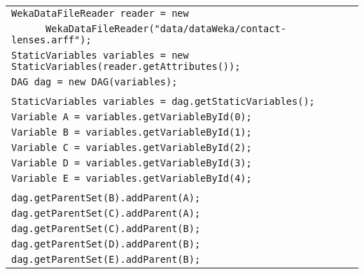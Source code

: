\begin{table}[H]
\begin{tabular}{l} \hline

        \texttt{WekaDataFileReader reader = new}\\
         \texttt{~~~~~~WekaDataFileReader("data/dataWeka/contact-lenses.arff");}\\

        \texttt{StaticVariables variables = new StaticVariables(reader.getAttributes());}\\
        \texttt{DAG dag = new DAG(variables);}\\\\

        \texttt{StaticVariables variables = dag.getStaticVariables();}\\
        \texttt{Variable A = variables.getVariableById(0);}\\
        \texttt{Variable B = variables.getVariableById(1);}\\
        \texttt{Variable C = variables.getVariableById(2);}\\
        \texttt{Variable D = variables.getVariableById(3);}\\ 
        \texttt{Variable E = variables.getVariableById(4);}\\ \\         


        \texttt{dag.getParentSet(B).addParent(A);}\\
        \texttt{dag.getParentSet(C).addParent(A);}\\
        \texttt{dag.getParentSet(C).addParent(B);}\\
        \texttt{dag.getParentSet(D).addParent(B);}\\
        \texttt{dag.getParentSet(E).addParent(B);}\\\hline 

\end{tabular}
\end{table}